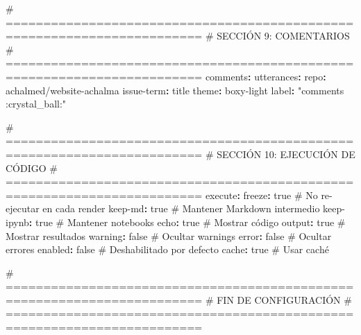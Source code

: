 \documentclass[
  doc,
  floatsintext,
  longtable,
  a4paper,
  nolmodern,
  notxfonts,
  notimes,
  12pt,
  colorlinks=true,linkcolor=blue,citecolor=blue,urlcolor=blue]{apa7}
\newenvironment{Shaded}{\begin{snugshade}}{\end{snugshade}}
\newcommand{\AttributeTok}[1]{\textcolor[rgb]{0.40,0.45,0.13}{#1}}
\newcommand{\CharTok}[1]{\textcolor[rgb]{0.13,0.47,0.30}{#1}}
\newcommand{\CommentTok}[1]{\textcolor[rgb]{0.37,0.37,0.37}{#1}}
\newcommand{\FunctionTok}[1]{\textcolor[rgb]{0.28,0.35,0.67}{#1}}
\newcommand{\KeywordTok}[1]{\textcolor[rgb]{0.00,0.23,0.31}{\textbf{#1}}}
\newcommand{\StringTok}[1]{\textcolor[rgb]{0.13,0.47,0.30}{#1}}
\begin{document}
\begin{Shaded}
\begin{Highlighting}[]
\CommentTok{\# ========================================================================}
\CommentTok{\# SECCIÓN 9: COMENTARIOS}
\CommentTok{\# ========================================================================}
\FunctionTok{comments}\KeywordTok{:}
\AttributeTok{  }\FunctionTok{utterances}\KeywordTok{:}
\AttributeTok{    }\FunctionTok{repo}\KeywordTok{:}\AttributeTok{ achalmed/website{-}achalma}
\AttributeTok{    }\FunctionTok{issue{-}term}\KeywordTok{:}\AttributeTok{ title}
\AttributeTok{    }\FunctionTok{theme}\KeywordTok{:}\AttributeTok{ boxy{-}light}
\AttributeTok{    }\FunctionTok{label}\KeywordTok{:}\AttributeTok{ }\StringTok{"comments :crystal\_ball:"}

\CommentTok{\# ========================================================================}
\CommentTok{\# SECCIÓN 10: EJECUCIÓN DE CÓDIGO}
\CommentTok{\# ========================================================================}
\FunctionTok{execute}\KeywordTok{:}
\AttributeTok{  }\FunctionTok{freeze}\KeywordTok{:}\AttributeTok{ }\CharTok{true}\CommentTok{                            \# No re{-}ejecutar en cada render}
\AttributeTok{  }\FunctionTok{keep{-}md}\KeywordTok{:}\AttributeTok{ }\CharTok{true}\CommentTok{                           \# Mantener Markdown intermedio}
\AttributeTok{  }\FunctionTok{keep{-}ipynb}\KeywordTok{:}\AttributeTok{ }\CharTok{true}\CommentTok{                        \# Mantener notebooks}
\AttributeTok{  }\FunctionTok{echo}\KeywordTok{:}\AttributeTok{ }\CharTok{true}\CommentTok{                              \# Mostrar código}
\AttributeTok{  }\FunctionTok{output}\KeywordTok{:}\AttributeTok{ }\CharTok{true}\CommentTok{                            \# Mostrar resultados}
\AttributeTok{  }\FunctionTok{warning}\KeywordTok{:}\AttributeTok{ }\CharTok{false}\CommentTok{                          \# Ocultar warnings}
\AttributeTok{  }\FunctionTok{error}\KeywordTok{:}\AttributeTok{ }\CharTok{false}\CommentTok{                            \# Ocultar errores}
\AttributeTok{  }\FunctionTok{enabled}\KeywordTok{:}\AttributeTok{ }\CharTok{false}\CommentTok{                          \# Deshabilitado por defecto}
\AttributeTok{  }\FunctionTok{cache}\KeywordTok{:}\AttributeTok{ }\CharTok{true}\CommentTok{                             \# Usar caché}

\CommentTok{\# ========================================================================}
\CommentTok{\# FIN DE CONFIGURACIÓN}
\CommentTok{\# ========================================================================}
\end{Highlighting}
\end{Shaded}
\end{document}
